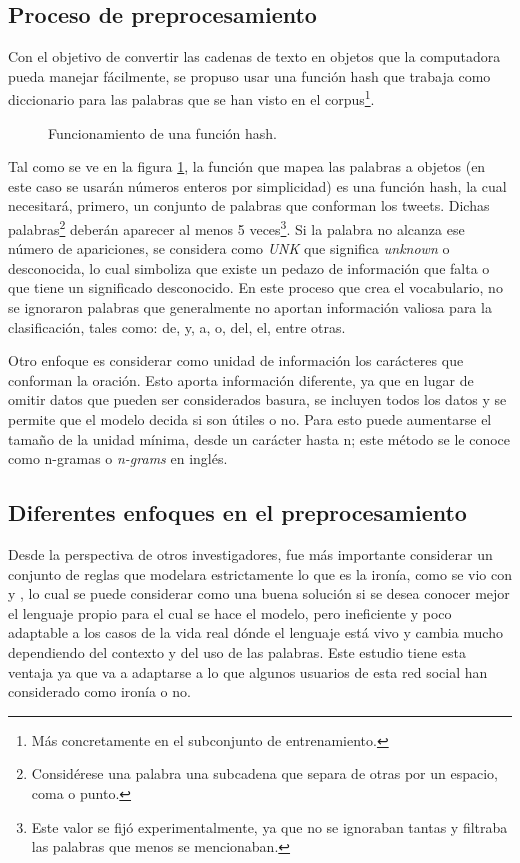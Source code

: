 \subsection{Proceso de preprocesamiento}
\par Con el objetivo de convertir las cadenas de texto en objetos que la computadora pueda manejar fácilmente, se propuso usar una función hash que trabaja como diccionario para las palabras que se han visto en el corpus\footnote{Más concretamente en el subconjunto de entrenamiento.}.
\begin{figure}[h]
	\centering
	
	\caption{Funcionamiento de una función hash.}
	\label{fig:funcionHash}
\end{figure}
\par Tal como se ve en la figura \ref{fig:funcionHash}, la función que mapea las palabras a objetos (en este caso se usarán números enteros por simplicidad) es una función hash, la cual necesitará, primero, un conjunto de palabras que conforman los tweets. Dichas palabras\footnote{Considérese
	una palabra una subcadena que separa de otras por un espacio, coma o punto.} deberán aparecer al menos 5 veces\footnote{Este valor se fijó experimentalmente, ya que no se ignoraban tantas y filtraba las palabras que menos se mencionaban.}. Si la palabra no alcanza ese número de apariciones, se considera como \textit{UNK} que significa \textit{unknown} o desconocida, lo cual simboliza que existe un pedazo de información que falta o que tiene un significado desconocido. En este proceso que crea el vocabulario, no se ignoraron palabras que generalmente no aportan información valiosa para la clasificación, tales como: de, y, a, o, del, el, entre otras.

\par Otro enfoque es considerar como unidad de información los carácteres que conforman la oración. Esto aporta información diferente, ya que en lugar de omitir datos que pueden ser considerados basura, se incluyen todos los datos y se permite que el modelo decida si son útiles o no. Para esto puede aumentarse el tamaño de la unidad mínima, desde un carácter hasta n; este método se le conoce como n-gramas o \textit{n-grams} en inglés.

\subsection{Diferentes enfoques en el preprocesamiento}

\par Desde la perspectiva de otros investigadores, fue más importante considerar un conjunto de reglas que modelara estrictamente lo que es la ironía, como se vio con \textcite{utsumi1996unified} y \textcite{kong2011formalization}, lo cual se puede considerar como una buena solución si se desea conocer mejor el lenguaje propio para el cual se  hace el modelo, pero ineficiente y poco adaptable a los casos de la vida real dónde el lenguaje está vivo y cambia mucho dependiendo del contexto y del uso de las palabras. Este estudio tiene esta ventaja ya que va a adaptarse a lo que algunos usuarios de esta red social han considerado como ironía o no.

